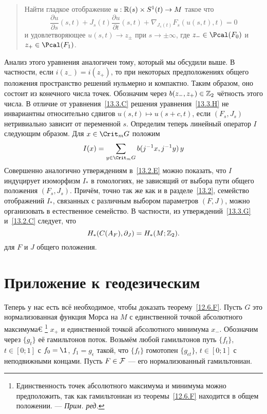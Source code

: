 \begin{quote}
  Найти гладкое отображение $u:\mathbb{R}(s)\times S^{1}(t)\to M$
  такое что 
  \begin{equation}\label{13.3.H}
    \frac{\partial u}{\partial s}(s,t)+
    J_{s}(t)\frac{\partial u}{\partial t}(s,t) +
    \nabla_{J_{s}(t)}F_{s}(u(s,t),t) = 0
  \end{equation}
  и удовлетворяющее $u(s,t)\to z_{\pm}$ при $s\to\pm\infty$, где
  $z_{-}\in\Pcal(F_{0})$ и $z_{+}\in\Pcal(F_{1})$.
\end{quote}
Анализ этого уравнения аналогичен тому, который мы обсудили выше.
В частности, если $i(z_{-})=i(z_{+})$, то при некоторых предположениях
общего положения пространство решений нульмерно и компактно. 
Таким образом, оно состоит из конечного числа точек.
Обозначим через $b(z_{-},z_{+})\in\mathbb{Z}_{2}$ чётность этого числа.
В отличие от уравнения~\ref{13.3.C} решения
уравнения~\ref{13.3.H} не инвариантны относительно сдвигов
$u(s,t)\mapsto u(s+c,t)$, если $(F_{s}, J_{s})$ нетривиально зависит
от переменной $s$.
Определим теперь линейный оператор $I$ следующим образом.
Для $x\in\Crit_{m}G$ положим
\begin{equation}
I(x) = \sum_{y\in\Crit_{m}G}b(j^{-1}x,j^{-1}y)\,y
\label{13.3.I}
\end{equation}
Совершенно аналогично утверждениям в~\ref{13.2.E} можно показать, что
$I$ индуцирует изоморфизм $I_{*}$ в гомологиях, не зависящий от выбора
пути общего положения $(F_{s}, J_{s})$. 
Причём, точно так же как и в разделе~\ref{13.2}, семейство отображений
$I_{*}$, связанных с различным выбором параметров $(F,J)$, можно
организовать в естественное семейство.
В частности, из утверждений~\ref{13.3.G} и~\ref{13.2.C} следует,
что 
\[
H_{*}(C(A_{F}),\partial_{J}) = H_{*}(M;\mathbb{Z}_{2}).
\]
для $F$ и $J$ общего положения.

\section{Приложение к геодезическим}\label{sec:13.4}

Теперь у нас есть всё необходимое, чтобы доказать теорему~\ref{12.6.F}.
Пусть $G$ это нормализованная функция Морса на $M$ с
единственной
точкой абсолютного максимума€
\footnote{Единственность точек абсолютного
максимума и минимума можно предположить, так как гамильтониан из
теоремы~\ref{12.6.F} находится в общем положении. — \textit{Прим. ред.}} $x_{+}$ и единственной точкой абсолютного
минимума $x_{-}$. 
Обозначим через $\{g_{t}\}$ её гамильтонов поток.
Возьмём любой гамильтонов путь $\{f_{t}\}$, $t\in[0;1]$ с $f_{0}=\1$,
$f_{1}=g_{\epsilon}$ такой, что $\{f_{t}\}$ гомотопен $\{g_{\epsilon
t}\}$, $t\in[0;1]$ с неподвижными концами.
Пусть $F\in\mathcal{F}$ — его нормализованный гамильтониан.

